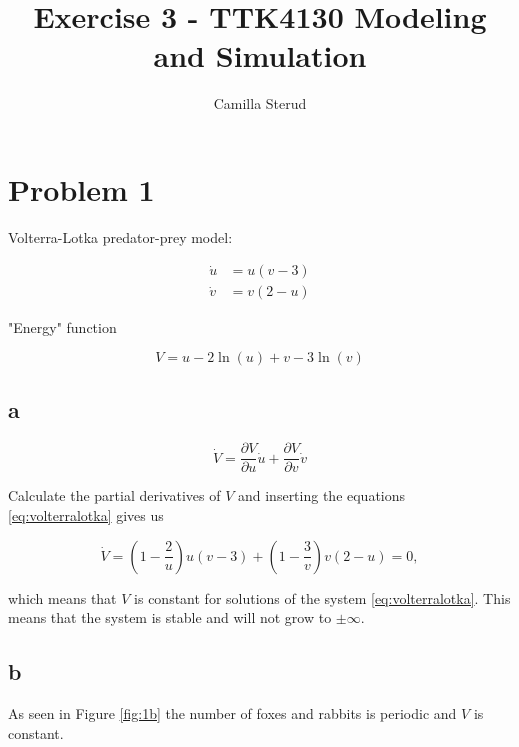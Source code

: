\documentclass{article}
\title{Exercise 3 - TTK4130 Modeling and Simulation}
\author{Camilla Sterud}
\date{}
\begin{document}
\maketitle

\newpage

\section{Problem 1}

Volterra-Lotka predator-prey model:

\begin{align} \label{eq:volterralotka}
    \dot u &= u(v-3) \\
    \dot v &= v(2-u)\nonumber
\end{align}

"Energy" function

\begin{equation*}
    V = u - 2\ln(u) + v - 3\ln(v)
\end{equation*}

\subsection{a}

\begin{equation*}
    \dot V = \frac{\partial V}{\partial u}\dot u + \frac{\partial V}{\partial v}\dot v
\end{equation*}

Calculate the partial derivatives of $V$ and inserting the equations \ref{eq:volterralotka} gives us

\begin{equation*}
    \dot V = (1-\frac{2}{u})u(v-3) + (1 - \frac{3}{v})v(2-u) = 0,
\end{equation*}

which means that $V$ is constant for solutions of the system \ref{eq:volterralotka}. This means that the system is stable and will not grow to $\pm\infty$.

\subsection{b}

As seen in Figure \ref{fig:1b} the number of foxes and rabbits is periodic and $V$ is constant. 
\end{document}
